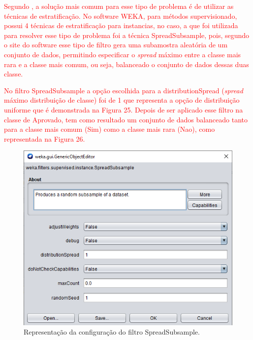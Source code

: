\par
\textcolor{red}{Segundo , a solução mais comum para esse tipo de problema é de utilizar as técnicas de estratificação. No software WEKA, para métodos supervisionado, possui 4 técnicas de estratificação para instancias, no caso, a que foi utilizada para resolver esse tipo de problema foi a técnica SpreadSubsample, pois, segundo o site do software  esse tipo de filtro gera uma subamostra aleatória de um conjunto de dados, permitindo especificar o \textit{spread} máximo entre a classe mais rara e a classe mais comum, ou seja, balanceado o conjunto de dados dessas duas classe.}

\par
\textcolor{red}{No filtro SpreadSubsample a opção escolhida para a distributionSpread (\textit{spread} máximo distribuição de classe) foi de 1 que representa a opção de distribuição uniforme que é demonstrada na Figura 25. Depois de ser aplicado esse filtro na classe de Aprovado, tem como resultado um conjunto de dados balanceado tanto para a classe mais comum (Sim) como a classe mais rara (Nao), como representada na Figura 26.}

\par
\begin{figure}[!htp]
	\begin{center}
    \caption{\label{fig:waveform_fig} Representação da configuração  do filtro SpreadSubsample.}
	\includegraphics[scale=0.99]{Figuras/SpreadSubsample.png}
	\end{center}
\end{figure}

